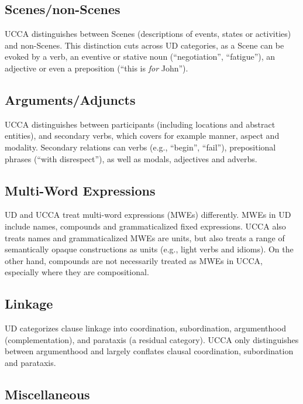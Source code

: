 \documentclass[11pt,a4paper]{article}
\begin{document}
\subsection{Scenes/non-Scenes}\label{sec:scenes}

      UCCA distinguishes between Scenes (descriptions of events, states or activities) and non-Scenes. 
      This distinction cuts across UD categories, as a Scene can be evoked by a verb, an eventive or stative
      noun (``negotiation'', ``fatigue''), an adjective or even a preposition (``this is \textit{for} John'').

\subsection{Arguments/Adjuncts}\label{sec:arguments}

      UCCA distinguishes between participants (including locations and abstract entities), and secondary verbs, 
      which covers for example manner, aspect and modality. Secondary relations can verbs (e.g., ``begin'', ``fail''),
      prepositional phrases (``with disrespect''), as well as modals, adjectives and adverbs.

\subsection{Multi-Word Expressions}\label{sec:mwe}

      UD and UCCA treat multi-word expressions (MWEs) differently. MWEs in UD include names, compounds and grammaticalized fixed 
      expressions. UCCA also treats names and grammaticalized MWEs are units, but also treats 
      a range of semantically opaque constructions as units (e.g., light verbs and idioms).
      On the other hand, compounds are not necessarily treated as MWEs in UCCA, especially where they are compositional.

\subsection{Linkage}\label{sec:linkage}

      UD categorizes clause linkage into coordination, subordination, argumenthood (complementation),
      and parataxis (a residual category). UCCA only distinguishes between argumenthood 
      and largely conflates clausal coordination, subordination and parataxis. 

\subsection{Miscellaneous}\label{sec:misc}
\end{document}
